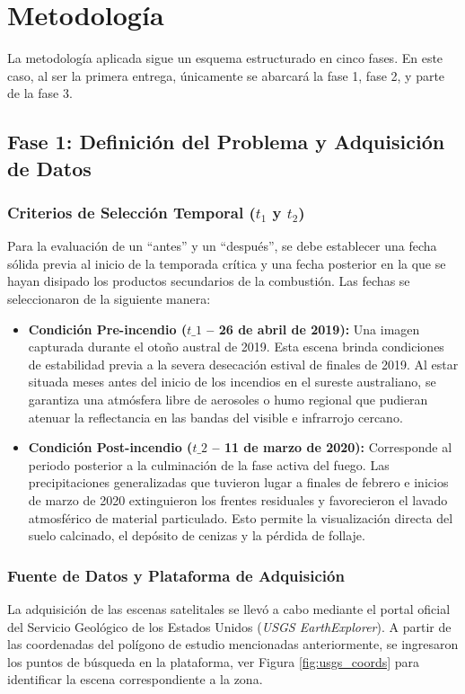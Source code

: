 \documentclass[12pt]{article}
\begin{document}
\section{Metodología}
La metodología aplicada sigue un esquema estructurado en cinco fases. En este caso, al ser la primera entrega, únicamente se abarcará la fase 1, fase 2, y parte de la fase 3.

\subsection{Fase 1: Definición del Problema y Adquisición de Datos}

\subsubsection{Criterios de Selección Temporal ($t_1$ y $t_2$)}
Para la evaluación de un ``antes'' y un ``después'', se debe establecer una fecha sólida previa al inicio de la temporada crítica y una fecha posterior en la que se hayan disipado los productos secundarios de la combustión. Las fechas se seleccionaron de la siguiente manera:

\begin{itemize}
    \item \textbf{Condición Pre-incendio ($t\_1$ -- 26 de abril de 2019):} Una imagen capturada durante el otoño austral de 2019. Esta escena brinda condiciones de estabilidad previa a la severa desecación estival de finales de 2019. Al estar situada meses antes del inicio de los incendios en el sureste australiano, se garantiza una atmósfera libre de aerosoles o humo regional que pudieran atenuar la reflectancia en las bandas del visible e infrarrojo cercano.
    
    \item \textbf{Condición Post-incendio ($t\_2$ -- 11 de marzo de 2020):} Corresponde al periodo posterior a la culminación de la fase activa del fuego. Las precipitaciones generalizadas que tuvieron lugar a finales de febrero e inicios de marzo de 2020 extinguieron los frentes residuales y favorecieron el lavado atmosférico de material particulado. Esto permite la visualización directa del suelo calcinado, el depósito de cenizas y la pérdida de follaje.
\end{itemize}

\subsubsection{Fuente de Datos y Plataforma de Adquisición}
La adquisición de las escenas satelitales se llevó a cabo mediante el portal oficial del Servicio Geológico de los Estados Unidos (\textit{USGS EarthExplorer}). A partir de las coordenadas del polígono de estudio mencionadas anteriormente, se ingresaron los puntos de búsqueda en la plataforma, ver Figura \ref{fig:usgs_coords} para identificar la escena correspondiente a la zona.
\end{document}
